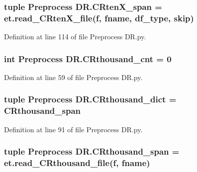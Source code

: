 \hypertarget{namespace_preprocess_01_d_r_a9c3f672064dcd45d53eb354141ad8dde}{}
\subsubsection[{C\+Rten\+X\+\_\+span}]{\setlength{\rightskip}{0pt plus 5cm}tuple Preprocess D\+R.\+C\+Rten\+X\+\_\+span = et.\+read\+\_\+\+C\+Rten\+X\+\_\+file({\bf f}, fname, {\bf df\+\_\+type}, {\bf skip})}\label{namespace_preprocess_01_d_r_a9c3f672064dcd45d53eb354141ad8dde}


Definition at line 114 of file Preprocess D\+R.\+py.

\hypertarget{namespace_preprocess_01_d_r_a9404d186af19463704b0d7514d09c28a}{}
\subsubsection[{C\+Rthousand\+\_\+cnt}]{\setlength{\rightskip}{0pt plus 5cm}int Preprocess D\+R.\+C\+Rthousand\+\_\+cnt = 0}\label{namespace_preprocess_01_d_r_a9404d186af19463704b0d7514d09c28a}


Definition at line 59 of file Preprocess D\+R.\+py.

\hypertarget{namespace_preprocess_01_d_r_a5972ec24a3edf386f881a64fc2e47ed5}{}
\subsubsection[{C\+Rthousand\+\_\+dict}]{\setlength{\rightskip}{0pt plus 5cm}tuple Preprocess D\+R.\+C\+Rthousand\+\_\+dict = {\bf C\+Rthousand\+\_\+span}}\label{namespace_preprocess_01_d_r_a5972ec24a3edf386f881a64fc2e47ed5}


Definition at line 91 of file Preprocess D\+R.\+py.

\hypertarget{namespace_preprocess_01_d_r_a6d31701846ffc5afde0480e8237a7cf3}{}
\subsubsection[{C\+Rthousand\+\_\+span}]{\setlength{\rightskip}{0pt plus 5cm}tuple Preprocess D\+R.\+C\+Rthousand\+\_\+span = et.\+read\+\_\+\+C\+Rthousand\+\_\+file({\bf f}, fname)}\label{namespace_preprocess_01_d_r_a6d31701846ffc5afde0480e8237a7cf3}


